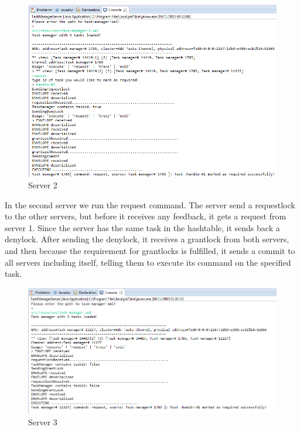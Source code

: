 \begin{figure}[H]
\caption{Server 2}
\includegraphics[scale=0.6]{images/CCServer2.png}
\end{figure}
\vspace{10pt}

In the second server we run the request command. The server send a requestlock to the other servers, but before it receives any feedback, it gets a request from server 1. Since the server has the same task in the hashtable, it sends back a denylock. After sending the denylock, it receives a grantlock from both servers, and then because the requirement for grantlocks is fulfilled, it sends a commit to all servers including itself, telling them to execute its command on the specified task. \\

\begin{figure}[H]
\caption{Server 3}
\includegraphics[scale=0.6]{images/CCServer3.png}
\end{figure}
\vspace{10pt}

